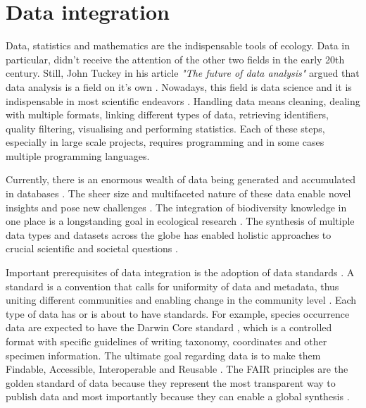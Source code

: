 \section{Data integration}
\label{sec:dataintegration}

Data, statistics and mathematics are the indispensable tools of ecology.
Data in particular, didn't receive the attention of the other two fields in the early 20th 
century. Still, John Tuckey in his article \textit{"The future of data analysis"} 
argued that data analysis is a field on it's own \parencite{tukey1962}.
Nowadays, this field is data science and it is indispensable in most scientific endeavors \parencite{peng2022perspective}. 
Handling data means cleaning, dealing with multiple formats, linking different types 
of data, retrieving identifiers, quality filtering, visualising and performing statistics.
Each of these steps, especially in large scale projects, requires programming and 
in some cases multiple programming languages. 

Currently, there is an enormous wealth of data being generated and 
accumulated in databases \parencite{thessen2021from}. 
The sheer size and multifaceted nature of these data 
enable novel insights and pose new challenges \parencite{michener_ecological_2015}.
The integration of biodiversity knowledge in one place is a longstanding
goal in ecological research \parencite{Walter_2012}. The synthesis of multiple
data types and datasets across the globe has enabled 
holistic approaches to crucial scientific and societal questions \parencite{heberling_j_mason_data_2021}.

Important prerequisites of data integration is the adoption of data standards \parencite{michener_ecological_2015}. 
A standard is a convention that calls for uniformity of data and metadata,
thus uniting different communities and enabling change in the community level \parencite{Field2011}.
Each type of data has or is about to have standards. For example, species 
occurrence data are expected to have the Darwin Core standard \parencite{wieczorek_darwin_2012},
which is a controlled format with specific guidelines of writing taxonomy, coordinates
and other specimen information. 
The ultimate goal regarding data is to make them Findable, Accessible, Interoperable and Reusable \parencite{wilkinson2016the-fair}.
The FAIR principles are the golden standard of data because they represent the most 
transparent way to publish data and most importantly because they can enable a 
global synthesis \parencite{heberling_j_mason_data_2021}.

